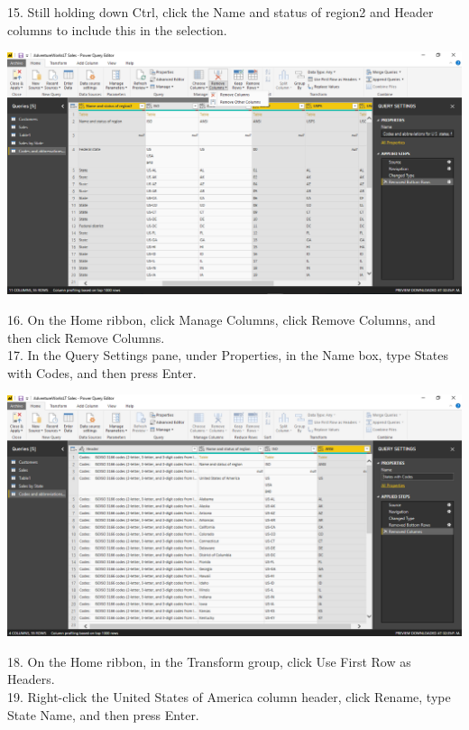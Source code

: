 15. Still holding down Ctrl, click the Name and status of region2 and Header columns to include this in
the selection.\\

	\begin{center}
	\includegraphics[width=17cm]{./Imagenes/Ejercicio1/Tarea4/11}
	\end{center}	

16. On the Home ribbon, click Manage Columns, click Remove Columns, and then click Remove Columns.\\
17. In the Query Settings pane, under Properties, in the Name box, type States with Codes, and then
press Enter.\\

	\begin{center}
	\includegraphics[width=17cm]{./Imagenes/Ejercicio1/Tarea4/12}
	\end{center}	

18. On the Home ribbon, in the Transform group, click Use First Row as Headers.\\
19. Right-click the United States of America column header, click Rename, type State Name, and then
press Enter.\\

